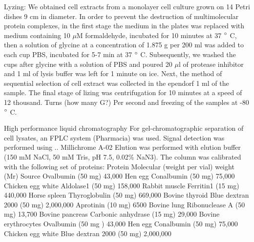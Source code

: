 \documentclass[a4paper,12pt]{article}
\begin{document}
\cite{mclean2018trajr}
Lyzing:
We obtained cell extracts from a monolayer cell culture grown on 14 Petri dishes 9 cm in diameter.
In order to prevent the destruction of multimolecular protein complexes, in the first stage the medium in the plates was replaced with medium containing 10 $\mu$M formaldehyde, incubated for 10 minutes at 37 $\degree$ C, then a solution of glycine at a concentration of 1.875 g per 200 ml was added to each cup PBS, incubated for 5-7 min at 37 $\degree$  C. Subsequently, we washed the cups after glycine with a solution of PBS and poured 20 $\mu$l of protease inhibitor and 1 ml of lysis buffer was left for 1 minute on ice.
Next, the method of sequential selection of cell extract was collected in the ependorf 1 ml of the sample. The final stage of lizing was centrifugation for 10 minutes at a speed of 12 thousand. Turns (how many G?) Per second and freezing of the samples at -80 $\degree$  C.

High performance liquid chromatography
For gel-chromatographic separation of cell lysates, an FPLC system (Pharmacia) was used.
Signal detection was performed using .. Millichrome A-02
Elution was performed with elution buffer (150 mM NaCl, 50 mM Tris, pH 7.5, 0.02\% NaN3).
The column was calibrated with the following set of proteins:
Protein Molecular (weight per vial) weight (Mr) Source Ovalbumin (50 mg) 43,000 Hen egg Conalbumin (50 mg) 75,000 Chicken egg white Aldolase1 (50 mg) 158,000 Rabbit muscle Ferritin1 (15 mg) 440,000 Horse spleen Thyroglobulin (50 mg) 669,000 Bovine thyroid Blue dextran 2000 (50 mg) 2,000,000 Aprotinin (10 mg) 6500 Bovine lung Ribonuclease A (50 mg) 13,700 Bovine pancreas Carbonic anhydrase (15 mg) 29,000 Bovine erythrocytes Ovalbumin (50 mg ) 43,000 Hen egg Conalbumin (50 mg) 75,000 Chicken egg white Blue dextran 2000 (50 mg) 2,000,000
\end{document}
